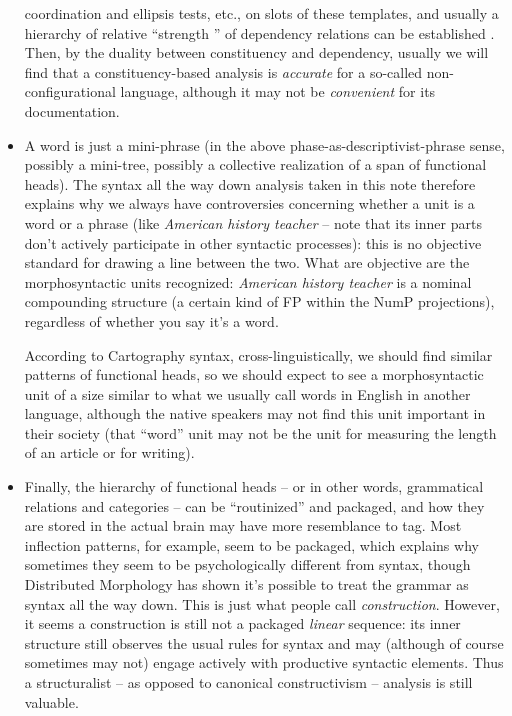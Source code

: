 \documentclass[a4paper, oneside]{report}
\newcommand*{\citesec}[1]{\S~{#1}}
\newcommand*{\term}[1]{\emph{#1}}
\newcommand{\form}[1]{\emph{#1}}
\begin{document}
\begin{itemize}
        coordination and ellipsis tests, etc.,
        on slots of these templates, 
        and usually a hierarchy of 
        relative ``strength '' of dependency relations
        can be established 
        \citep[\citesec{1.6}]{danckaert2017development}.
        Then, by the duality between constituency and dependency, 
        usually we will find 
        that a constituency-based analysis is \emph{accurate} for 
        a so-called non-configurational language, 
        although it may not be \emph{convenient} 
        for its documentation.
    \item A word is just a mini-phrase 
        (in the above phase-as-descriptivist-phrase sense, 
        possibly a mini-tree, possibly a collective realization of a span of functional heads).
        The syntax all the way down analysis taken in this note 
        therefore explains why we always have controversies 
        concerning whether a unit is a word or a phrase 
        (like \form{American history teacher} 
        -- note that its inner parts don't actively participate in other syntactic processes):
        this is no objective standard for drawing a line between the two. 
        What are objective are the morphosyntactic units recognized: 
        \form{American history teacher} is a nominal compounding structure 
        (a certain kind of FP within the NumP projections),
        regardless of whether you say it's a word. 

        According to Cartography syntax, 
        cross-linguistically, 
        we should find similar patterns of functional heads,
        so we should expect to see a morphosyntactic unit 
        of a size similar to what we usually call words in English 
        in another language, 
        although the native speakers may not find this unit important in their society 
        (that ``word'' unit may not be the unit for measuring the length of an article or for writing).
    \item Finally, the hierarchy of functional heads -- or in other words, 
        grammatical relations and categories -- 
        can be ``routinized'' and packaged,
        and how they are stored in the actual brain 
        may have more resemblance to \ac{tag}. 
        Most inflection patterns, for example, 
        seem to be packaged, 
        which explains why sometimes they seem to be psychologically different from syntax, 
        though Distributed Morphology has shown it's possible to treat the grammar 
        as syntax all the way down. 
        This is just what people call \term{construction}.
        However, it seems a construction is still not a packaged \emph{linear} sequence: 
        its inner structure still observes the usual rules for syntax 
        and may (although of course sometimes may not) engage 
        actively with productive syntactic elements. 
        Thus a structuralist -- as opposed to canonical constructivism -- 
        analysis is still valuable.
\end{itemize}
\end{document}
